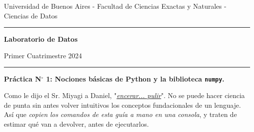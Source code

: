 \documentclass[a4paper,11pt]{article}
\theoremstyle{definition}
\begin{document}
\centerline{{\small Universidad de Buenos Aires - Facultad de Ciencias Exactas y Naturales - Ciencias de Datos}}

\vskip 0.2cm

\hrule

\vskip 0.2cm

 \centerline{{\bf\Large{\sc Laboratorio de Datos}}}

 \vskip 0.2cm

 \centerline{\ttfamily Primer Cuatrimestre 2024}

\vskip 0.2cm

 \hrule

 \bigskip
 \centerline{\bf Práctica N$^\circ$ 1: Nociones básicas de Python y la biblioteca \lstinline{numpy}.}
 \bigskip

Como le dijo el Sr. Miyagi a Daniel, "\emph{\href{https://www.youtube.com/watch?v=tM-wKYKw0tI}{encerar... pulir}}". No se puede hacer ciencia de punta sin antes volver intuitivos los conceptos fundacionales de un lenguaje. Así que \emph{copien los comandos de esta guía a mano en una consola}, y traten de estimar qué van a devolver, antes de ejecutarlos.

\end{document}
